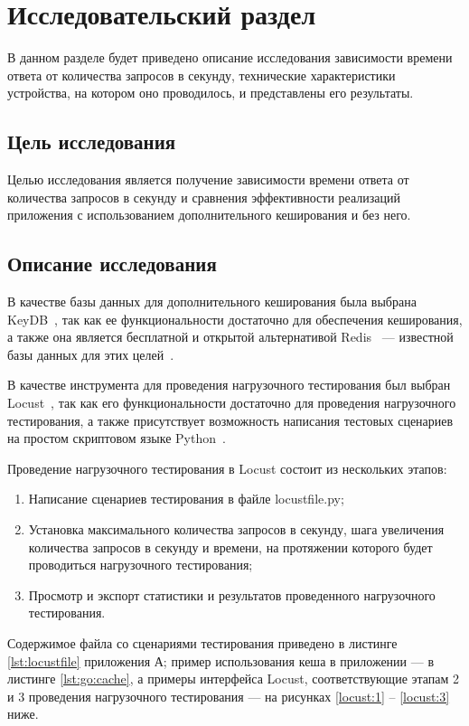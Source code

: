 \section{Исследовательский раздел}

В данном разделе будет приведено описание исследования зависимости времени ответа от количества запросов в секунду, технические характеристики устройства, на котором оно проводилось, и представлены его результаты.

\subsection*{Цель исследования}

Целью исследования является получение зависимости времени ответа от количества запросов в секунду и сравнения эффективности реализаций приложения с использованием дополнительного кеширования и без него.

\subsection{Описание исследования}

В качестве базы данных для дополнительного кеширования была выбрана KeyDB~\cite{keydb}, так как ее функциональности достаточно для обеспечения кеширования, а также она является бесплатной и открытой альтернативой Redis~\cite{redis} --- известной базы данных для этих целей~\cite{redis-jobs}.

В качестве инструмента для проведения нагрузочного тестирования был выбран Locust~\cite{locust}, так как его функциональности достаточно для проведения нагрузочного тестирования, а также присутствует возможность написания тестовых сценариев на простом скриптовом языке Python~\cite{python}.

Проведение нагрузочного тестирования в Locust состоит из нескольких этапов:
\begin{enumerate}
    \item Написание сценариев тестирования в файле locustfile.py;
    \item Установка максимального количества запросов в секунду, шага увеличения количества запросов в секунду и времени, на протяжении которого будет проводиться нагрузочного тестирования;
    \item Просмотр и экспорт статистики и результатов проведенного нагрузочного тестирования.
\end{enumerate}

Содержимое файла со сценариями тестирования приведено в листинге \ref{lst:locustfile} приложения А; пример использования кеша в приложении --- в листинге \ref{lst:go:cache}, а примеры интерфейса Locust, соответствующие этапам 2 и 3 проведения нагрузочного тестирования --- на рисунках \ref{locust:1} -- \ref{locust:3} ниже.


